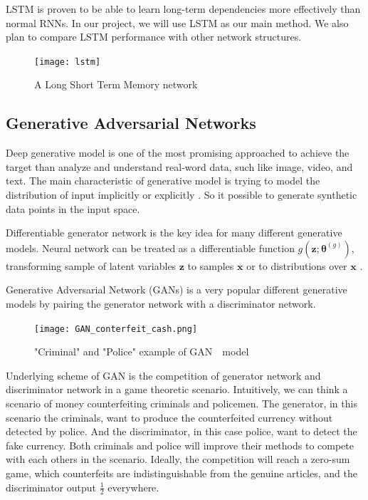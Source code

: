 LSTM is proven to be able to learn long-term dependencies more effectively than normal RNNs. In our project, we will use LSTM as our main method. We also plan to compare LSTM performance with other network structures.
\begin{figure}[htb]
	\centering
	\texttt{[image: lstm]}
	\caption{A Long Short Term Memory network}
	\label{fig:lstm}
\end{figure} 

\subsection{Generative Adversarial Networks}
Deep generative model is one of the most promising approached to achieve the target than analyze and understand real-word data, such like image, video, and text. The main characteristic of generative model is trying to model the distribution of input implicitly or explicitly \cite{christopher2006prml}. So it possible to generate synthetic data points in the input space.

Differentiable generator network is the key idea for many different generative models. Neural network can be treated as a differentiable function $ g(\bm{z};\bm{\theta}^{(g)}) $, transforming sample of latent variables $ \mathbf{z} $ to samples $ \mathbf{x} $ or to distributions over $ \mathbf{x} $ \cite{goodfellow2016deeplearning}.

Generative Adversarial Network (GANs) \cite{goodfellow2014gan} is a very popular different generative models by pairing the generator network with a discriminator network.

\begin{figure}[htbp]
	\centering
	\texttt{[image: GAN\_conterfeit\_cash.png]}
	\caption{"Criminal" and "Police" example of GAN　model}
	\label{fig:GANcash}
\end{figure}

Underlying scheme of GAN is the competition of generator network and discriminator network in a game theoretic scenario. Intuitively, we can think a scenario of money counterfeiting criminals and policemen. The generator, in this scenario the criminals, want to produce the counterfeited currency without detected by police. And the discriminator, in this case police, want to detect the fake currency. Both criminals and police will improve their methods to compete with each others in the scenario. Ideally,  the competition will reach a zero-sum game, which counterfeits are indistinguishable from the genuine articles, and the discriminator output $ \frac{1}{2} $ everywhere.
 

